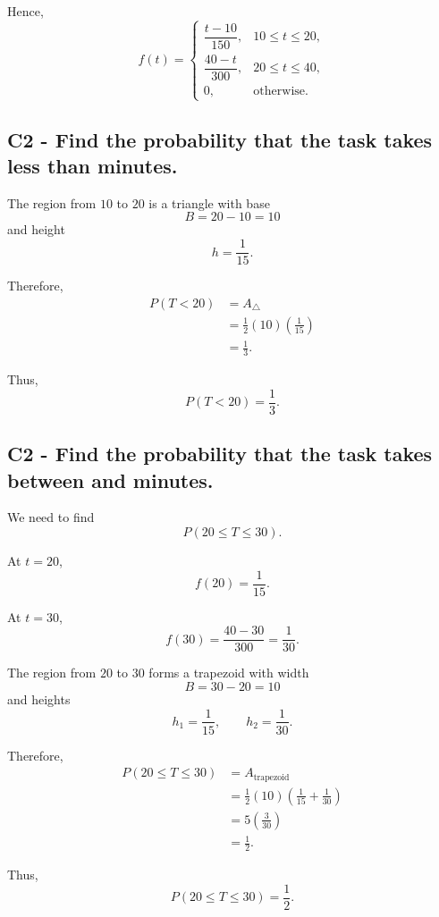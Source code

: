 {	Hence,
	\[
	f(t)=
	\begin{cases}
		\dfrac{t-10}{150}, & 10\le t\le20,\\[6pt]
		\dfrac{40-t}{300}, & 20\le t\le40,\\[6pt]
		0, & \text{otherwise.}
	\end{cases}
	\]
	

	\label{subsec:triangular-production-time-c2-b}
	\subsection*{C2 - Find the probability that the task takes less than  minutes. }
	
	The region from $10$ to $20$ is a triangle with base
	\[
	B=20-10=10
	\]
	and height
	\[
	h=\frac{1}{15}.
	\]
	
	Therefore,
	\[
	\begin{aligned}
		P(T<20)
		&=A_{\triangle}\\
		&=\frac{1}{2}(10)\left(\frac{1}{15}\right)\\
		&=\frac{1}{3}.
	\end{aligned}
	\]
	
	Thus,
	\[
	P(T<20)=\frac{1}{3}.
	\]
	

	\label{subsec:triangular-production-time-c2-c}
	\subsection*{C2 - Find the probability that the task takes between  and  minutes. }
	
	We need to find
	\[
	P(20\le T\le30).
	\]
	
	At $t=20$,
	\[
	f(20)=\frac{1}{15}.
	\]
	
	At $t=30$,
	\[
	f(30)=\frac{40-30}{300}
	=\frac{1}{30}.
	\]
	
	The region from $20$ to $30$ forms a trapezoid with width
	\[
	B=30-20=10
	\]
	and heights
	\[
	h_1=\frac{1}{15},
	\qquad
	h_2=\frac{1}{30}.
	\]
	
	Therefore,
	\[
	\begin{aligned}
		P(20\le T\le30)
		&=A_{\text{trapezoid}}\\
		&=\frac{1}{2}(10)
		\left(
		\frac{1}{15}+\frac{1}{30}
		\right)\\
		&=5\left(\frac{3}{30}\right)\\
		&=\frac{1}{2}.
	\end{aligned}
	\]
	
	Thus,
	\[
	P(20\le T\le30)=\frac{1}{2}.
	\]
	

	}

